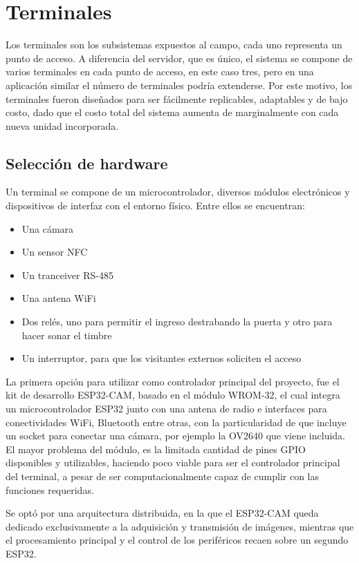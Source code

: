 \section{Terminales}
Los terminales son los subsistemas expuestos al campo, cada uno representa un punto de acceso. A diferencia del servidor, que es único, el sistema se compone de varios terminales en cada punto de acceso, en este caso tres, pero en una aplicación similar el número de terminales podría extenderse. Por este motivo, los terminales fueron diseñados para ser fácilmente replicables, adaptables y de bajo costo, dado que el costo total del sistema aumenta de marginalmente con cada nueva unidad incorporada.


\subsection{Selección de hardware}
Un terminal se compone de un microcontrolador, diversos módulos electrónicos y dispositivos de interfaz con el entorno físico. Entre ellos se encuentran:
\begin{itemize}
    \item Una cámara
    \item Un sensor NFC
    \item Un tranceiver RS-485
    \item Una antena WiFi
    \item Dos relés, uno para permitir el ingreso destrabando la puerta y otro para hacer sonar el timbre
    \item Un interruptor, para que los visitantes externos soliciten el acceso
\end{itemize}

La primera opción para utilizar como controlador principal del proyecto, fue el kit de desarrollo ESP32-CAM, basado en el módulo WROM-32, el cual integra un microcontrolador ESP32 junto con una antena de radio e interfaces para conectividades WiFi, Bluetooth entre otras, con la particularidad de que incluye un socket para conectar una cámara, por ejemplo la OV2640 que viene incluida. El mayor problema del módulo, es la limitada cantidad de pines GPIO disponibles y utilizables, haciendo poco viable para ser el controlador principal del terminal, a pesar de ser computacionalmente capaz de cumplir con las funciones requeridas.

Se optó por una arquitectura distribuida, en la que el ESP32-CAM queda dedicado exclusivamente a la adquisición y transmisión de imágenes, mientras que el procesamiento principal y el control de los periféricos recaen sobre un segundo ESP32.

